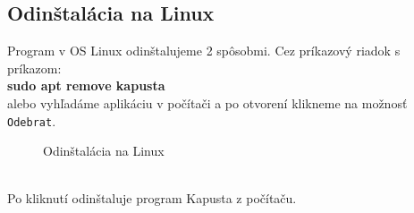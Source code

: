 \documentclass[a4paper, 11pt]{article}
\begin{document}
            \subsection{Odinštalácia na Linux}
                Program v OS Linux odinštalujeme 2 spôsobmi. Cez príkazový riadok s príkazom:\\
                \textbf{sudo apt remove kapusta}\\
                alebo vyhľadáme aplikáciu v počítači a po otvorení klikneme na možnosť \verb|Odebrat|.
                \begin{figure}[h]
                    \centering
                        \caption{Odinštalácia na Linux}
                \end{figure}
                \\Po kliknutí odinštaluje program Kapusta z počítaču.
 
    \newpage 
        
\end{document}
